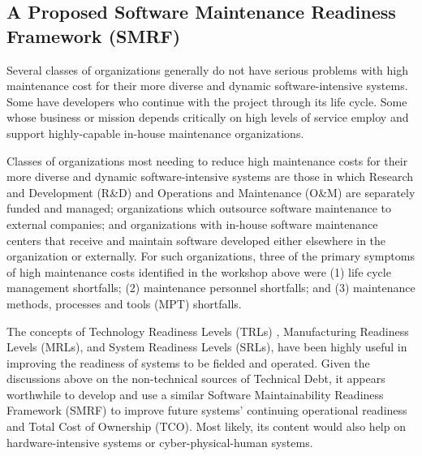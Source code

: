 \subsection{A Proposed Software Maintenance Readiness Framework (SMRF)}
\label{subsec:smrf}
Several classes of organizations generally do not have serious problems with high maintenance cost for their more diverse and dynamic software-intensive systems. Some have developers who continue with the project through its life cycle. Some whose business or mission depends critically on high levels of service employ and support highly-capable in-house maintenance organizations.

Classes of organizations most needing to reduce high maintenance costs for their more diverse and dynamic software-intensive systems are those in which Research and Development (R\&D) and Operations and Maintenance (O\&M) are separately funded and managed; organizations which outsource software maintenance to external companies; and organizations with in-house software maintenance centers that receive and maintain software developed either elsewhere in the organization or externally. For such organizations, three of the primary symptoms of high maintenance costs
identified in the workshop above were
(1) life cycle management shortfalls; (2) maintenance personnel shortfalls; and (3) maintenance methods, processes and tools (MPT) shortfalls.



The concepts of Technology Readiness Levels (TRLs) \cite{dod2011technology}, Manufacturing Readiness Levels (MRLs)\cite{cundiff2003manufacturing}, and System Readiness Levels (SRLs)\cite{sauser2006trl,sauser2007system}, have been highly useful in improving the readiness of systems to be fielded and operated.  Given the discussions above on the non-technical sources of Technical Debt, it appears worthwhile to develop and use a similar Software Maintainability Readiness Framework (SMRF) to improve future systems' continuing operational readiness and Total Cost of Ownership (TCO). Most likely, its content would also help on hardware-intensive systems or cyber-physical-human systems.




